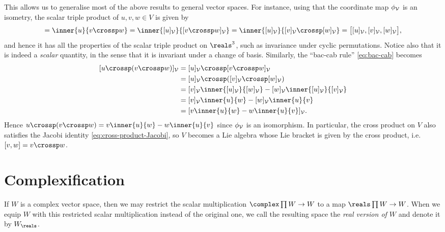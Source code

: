 \documentclass[article, a4paper, 11pt, oneside]{memoir}
\numberwithin{equation}{chapter}
\newcommand{\calV}{\mathcal{V}}
\begin{document}
This allows us to generalise most of the above results to general vector spaces. For instance, using that the coordinate map $\coordmap{\calV}$ is an isometry, the scalar triple product of $u,v,w \in V$ is given by
%
\begin{equation*}
    [u,v,w]
        = \inner{u}{v \crossp w}
        = \inner{\coordvec{u}{\calV}}{\coordvec{v \crossp w}{\calV}}
        = \inner{\coordvec{u}{\calV}}{\coordvec{v}{\calV} \crossp \coordvec{w}{\calV}}
        = \bigl[ \coordvec{u}{\calV}, \coordvec{v}{\calV}, \coordvec{w}{\calV} \bigr],
\end{equation*}
%
and hence it has all the properties of the scalar triple product on $\reals^3$, such as invariance under cyclic permutations. Notice also that it is indeed a \emph{scalar} quantity, in the sense that it is invariant under a change of basis. Similarly, the \enquote{bac-cab rule} \cref{eq:bac-cab} becomes
%
\begin{align*}
    \coordvec{u \crossp (v \crossp w)}{\calV}
        &= \coordvec{u}{\calV} \crossp \coordvec{v \crossp w}{\calV} \\
        &= \coordvec{u}{\calV} \crossp (\coordvec{v}{\calV} \crossp \coordvec{w}{\calV}) \\
        &= \coordvec{v}{\calV} \inner{\coordvec{u}{\calV}}{\coordvec{w}{\calV}} - \coordvec{w}{\calV} \inner{\coordvec{u}{\calV}}{\coordvec{v}{\calV}} \\
        &= \coordvec{v}{\calV} \inner{u}{w} - \coordvec{w}{\calV} \inner{u}{v} \\
        &= \coordvec{ v \inner{u}{w} - w \inner{u}{v} }{\calV}.
\end{align*}
%
Hence $u \crossp (v \crossp w) = v \inner{u}{w} - w \inner{u}{v}$ since $\coordmap{\calV}$ is an isomorphism. In particular, the cross product on $V$ also satisfies the Jacobi identity \cref{eq:cross-product-Jacobi}, so $V$ becomes a Lie algebra whose Lie bracket is given by the cross product, i.e. $[v,w] = v \crossp w$.


\chapter{Complexification}

If $W$ is a complex vector space, then we may restrict the scalar multiplication $\complex \prod W \to W$ to a map $\reals \prod W \to W$. When we equip $W$ with this restricted scalar multiplication instead of the original one, we call the resulting space the \emph{real version of $W$} and denote it by $W_\reals$.
\end{document}
